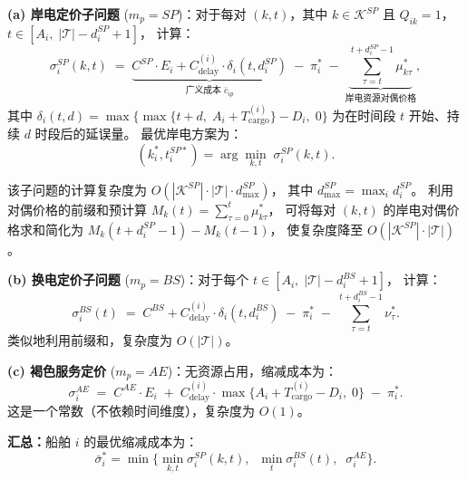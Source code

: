 \documentclass[11pt,a4paper]{article}
\begin{document}
\medskip
\noindent\textbf{(a) 岸电定价子问题}
($m_p = SP$)：对于每对 $(k, t)$，其中 $k \in \mathcal{K}^{SP}$
且 $Q_{ik} = 1$，$t \in [A_i,\; |\mathcal{T}| - d_i^{SP} + 1]$，
计算：
%
\begin{equation}
  \sigma_i^{SP}(k, t)
  \;=\; \underbrace{C^{SP} \cdot E_i + C_{\text{delay}}^{(i)} \cdot \delta_i(t, d_i^{SP})}_{
    \text{广义成本 } \bar{c}_{ip}}
  \;-\; \pi_i^*
  \;-\; \underbrace{\sum_{\tau = t}^{t + d_i^{SP} - 1} \mu_{k\tau}^*}_{
    \text{岸电资源对偶价格}},
  \tag{32}
\end{equation}
%
其中 $\delta_i(t, d) = \max\!\big\{\max\{t + d,\; A_i + T_{\text{cargo}}^{(i)}\} - D_i,\; 0\big\}$
为在时间段 $t$ 开始、持续 $d$ 时段后的延误量。
最优岸电方案为：
\begin{equation}
  (k_i^*, t_i^{SP*}) = \arg\min_{k, t} \; \sigma_i^{SP}(k, t).
  \tag{33}
\end{equation}

\noindent
该子问题的计算复杂度为 $O(|\mathcal{K}^{SP}| \cdot |\mathcal{T}| \cdot d_{\max}^{SP})$，
其中 $d_{\max}^{SP} = \max_{i} d_i^{SP}$。
利用对偶价格的前缀和预计算
$M_{k}(t) = \sum_{\tau=0}^{t} \mu_{k\tau}^*$，
可将每对 $(k, t)$ 的岸电对偶价格求和简化为
$M_{k}(t + d_i^{SP} - 1) - M_{k}(t - 1)$，
使复杂度降至 $O(|\mathcal{K}^{SP}| \cdot |\mathcal{T}|)$。

\medskip
\noindent\textbf{(b) 换电定价子问题}
($m_p = BS$)：对于每个 $t \in [A_i,\; |\mathcal{T}| - d_i^{BS} + 1]$，
计算：
%
\begin{equation}
  \sigma_i^{BS}(t)
  \;=\; C^{BS} + C_{\text{delay}}^{(i)} \cdot \delta_i(t, d_i^{BS})
  \;-\; \pi_i^*
  \;-\; \sum_{\tau = t}^{t + d_i^{BS} - 1} \nu_{\tau}^*.
  \tag{34}
\end{equation}
%
类似地利用前缀和，复杂度为 $O(|\mathcal{T}|)$。

\medskip
\noindent\textbf{(c) 褐色服务定价}
($m_p = AE$)：无资源占用，缩减成本为：
%
\begin{equation}
  \sigma_i^{AE}
  \;=\; C^{AE} \cdot E_i
  \;+\; C_{\text{delay}}^{(i)} \cdot \max\!\big\{A_i + T_{\text{cargo}}^{(i)} - D_i,\; 0\big\}
  \;-\; \pi_i^*.
  \tag{35}
\end{equation}
%
这是一个常数（不依赖时间维度），复杂度为 $O(1)$。

\medskip
\noindent\textbf{汇总：}船舶 $i$ 的最优缩减成本为：
\begin{equation}
  \bar{\sigma}_i^* = \min\!\Big\{
    \min_{k,t} \sigma_i^{SP}(k,t),\;\;
    \min_{t} \sigma_i^{BS}(t),\;\;
    \sigma_i^{AE}
  \Big\}.
  \tag{36}
\end{equation}
\end{document}
